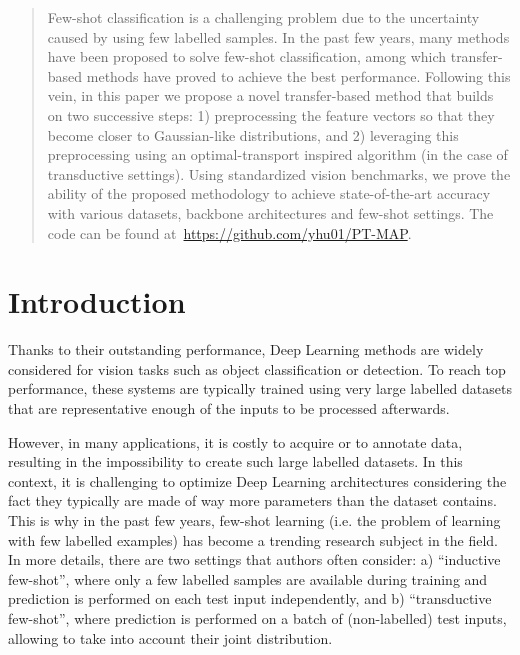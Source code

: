 \documentclass[twoside]{article}
\begin{document}

\begin{abstract}
  Few-shot classification is a challenging problem due to the uncertainty caused by using few labelled samples. In the past few years, many methods have been proposed to solve few-shot classification, among which transfer-based methods have proved to achieve the best performance. Following this vein, in this paper we propose a novel transfer-based method that builds on two successive steps: 1) preprocessing the feature vectors so that they become closer to Gaussian-like distributions, and 2) leveraging this preprocessing using an optimal-transport inspired algorithm (in the case of transductive settings). Using standardized vision benchmarks, we prove the ability of the proposed methodology to achieve state-of-the-art accuracy with various datasets, backbone architectures and few-shot settings. The code can be found at~\url{https://github.com/yhu01/PT-MAP}.
\end{abstract}

\section{Introduction}
\label{introduction}

Thanks to their outstanding performance, Deep Learning methods are widely considered for vision tasks such as object classification or detection. To reach top performance, these systems are typically trained using very large labelled datasets that are representative enough of the inputs to be processed afterwards.

However, in many applications, it is costly to acquire or to annotate data, resulting in the impossibility to create such large labelled datasets. In this context, it is challenging to optimize Deep Learning architectures considering the fact they typically are made of way more parameters than the dataset contains. This is why in the past few years, few-shot learning (i.e. the problem of learning with few labelled examples) has become a trending research subject in the field. In more details, there are two settings that authors often consider: a) ``inductive few-shot'', where only a few labelled samples are available during training and prediction is performed on each test input independently, and b) ``transductive few-shot'', where prediction is performed on a batch of (non-labelled) test inputs, allowing to take into account their joint distribution.
\end{document}
